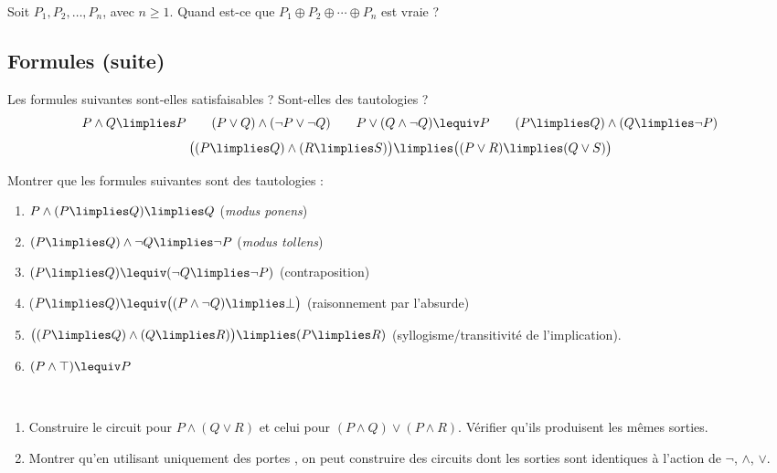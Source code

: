 \documentclass[11pt,class=report,crop=false]{standalone}
\begin{document}
\begin{exercicecours}
	Soit $P_1,P_2,\ldots,P_n$, avec $n \ge 1$.
	Quand est-ce que $P_1 \oplus P_2 \oplus \cdots \oplus P_n$ est vraie ?
\end{exercicecours}


\subsection*{Formules (suite)}

\begin{exercicecours}
	Les formules suivantes sont-elles satisfaisables ? Sont-elles des tautologies ?
	\[
	P \land Q \limplies P \qquad
	(P \lor Q) \land (\lnot P \lor \lnot Q) \qquad
	P \lor (Q  \land \lnot Q) \lequiv P \qquad
	(P \limplies Q) \land (Q \limplies \lnot P)
	\]
	\[
	\big( (P \limplies Q) \land (R \limplies S) \big) \limplies \big( (P \lor R) \limplies (Q \lor S) \big)
	\]
\end{exercicecours}

\begin{exercicecours}
	Montrer que les formules suivantes sont des tautologies :
	\begin{enumerate}
		
		\item $P \land (P \limplies Q) \limplies Q$ (\emph{modus ponens})
		
		\item $(P \limplies Q) \land \lnot Q \limplies \lnot P$ (\emph{modus tollens})
		
		\item $(P \limplies Q) \lequiv (\lnot Q \limplies \lnot P)$ (contraposition)
		
		\item ($P \limplies Q) \lequiv \big( (P \land \lnot Q) \limplies \bot \big)$ (raisonnement par l'absurde)
		
		\item $\big((P \limplies Q) \land (Q \limplies R)\big) \limplies (P \limplies R)$ (syllogisme/transitivité de l'implication).
		
		\item $(P \land \top) \lequiv P$
	\end{enumerate}
\end{exercicecours}

\begin{exercicecours}
	~
	\begin{enumerate}
		\item Construire le circuit pour $P \land (Q \lor R)$ et celui pour $(P \land Q) \lor (P \land R)$. Vérifier qu'ils produisent les mêmes sorties.
		
		\item Montrer qu'en utilisant uniquement des portes , on peut construire des circuits dont les sorties sont identiques à l'action de $\lnot$, $\land$, $\lor$.
	\end{enumerate}
\end{exercicecours}
\end{document}
